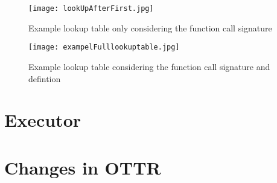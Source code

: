\begin{figure}
    \centering
    \begin{minipage}{.5\textwidth}
      \centering
      \texttt{[image: lookUpAfterFirst.jpg]}
      \caption{Example lookup table only considering the function call signature}
      \label{fig:lookUpAfterFirst}
    \end{minipage}%
    \begin{minipage}{.5\textwidth}
      \centering
      \texttt{[image: exampelFulllookuptable.jpg]}
      \caption{Example lookup table considering the function call signature and defintion}
      \label{fig:exampelFulllookuptable}
    \end{minipage}
\end{figure}

\section{Executor}

\section{Changes in OTTR}

